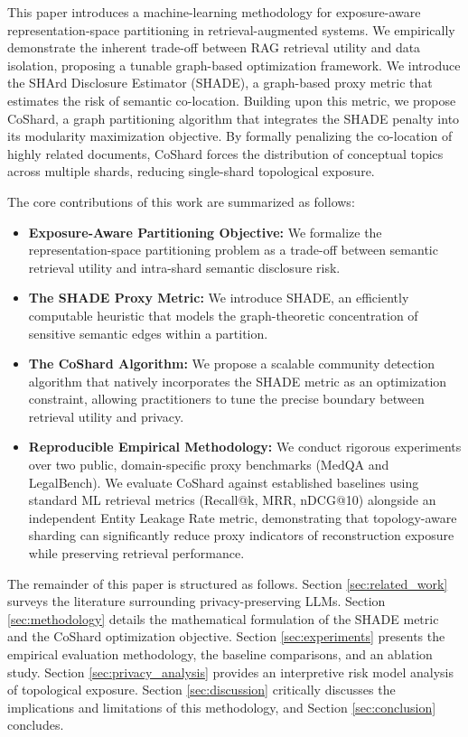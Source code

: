 This paper introduces a machine-learning methodology for exposure-aware representation-space partitioning in retrieval-augmented systems. We empirically demonstrate the inherent trade-off between RAG retrieval utility and data isolation, proposing a tunable graph-based optimization framework. We introduce the SHArd Disclosure Estimator (SHADE), a graph-based proxy metric that estimates the risk of semantic co-location. Building upon this metric, we propose CoShard, a graph partitioning algorithm that integrates the SHADE penalty into its modularity maximization objective. By formally penalizing the co-location of highly related documents, CoShard forces the distribution of conceptual topics across multiple shards, reducing single-shard topological exposure.

The core contributions of this work are summarized as follows:

\begin{itemize}
    \item \textbf{Exposure-Aware Partitioning Objective:} We formalize the representation-space partitioning problem as a trade-off between semantic retrieval utility and intra-shard semantic disclosure risk.
    \item \textbf{The SHADE Proxy Metric:} We introduce SHADE, an efficiently computable heuristic that models the graph-theoretic concentration of sensitive semantic edges within a partition.
    \item \textbf{The CoShard Algorithm:} We propose a scalable community detection algorithm that natively incorporates the SHADE metric as an optimization constraint, allowing practitioners to tune the precise boundary between retrieval utility and privacy.
    \item \textbf{Reproducible Empirical Methodology:} We conduct rigorous experiments over two public, domain-specific proxy benchmarks (MedQA and LegalBench). We evaluate CoShard against established baselines using standard ML retrieval metrics (Recall@k, MRR, nDCG@10) alongside an independent Entity Leakage Rate metric, demonstrating that topology-aware sharding can significantly reduce proxy indicators of reconstruction exposure while preserving retrieval performance.
\end{itemize}

The remainder of this paper is structured as follows. Section \ref{sec:related_work} surveys the literature surrounding privacy-preserving LLMs. Section \ref{sec:methodology} details the mathematical formulation of the SHADE metric and the CoShard optimization objective. Section \ref{sec:experiments} presents the empirical evaluation methodology, the baseline comparisons, and an ablation study. Section \ref{sec:privacy_analysis} provides an interpretive risk model analysis of topological exposure. Section \ref{sec:discussion} critically discusses the implications and limitations of this methodology, and Section \ref{sec:conclusion} concludes.
